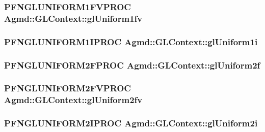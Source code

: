 \hypertarget{class_agmd_1_1_g_l_context_a8435812e978eb65ece3e0ab9ff0fcf0a}{
\subsubsection[{gl\+Uniform1fv}]{\setlength{\rightskip}{0pt plus 5cm}P\+F\+N\+G\+L\+U\+N\+I\+F\+O\+R\+M1\+F\+V\+P\+R\+O\+C Agmd\+::\+G\+L\+Context\+::gl\+Uniform1fv}}\label{class_agmd_1_1_g_l_context_a8435812e978eb65ece3e0ab9ff0fcf0a}
\hypertarget{class_agmd_1_1_g_l_context_a367e6c653c384909450dabecac8087e4}{
\subsubsection[{gl\+Uniform1i}]{\setlength{\rightskip}{0pt plus 5cm}P\+F\+N\+G\+L\+U\+N\+I\+F\+O\+R\+M1\+I\+P\+R\+O\+C Agmd\+::\+G\+L\+Context\+::gl\+Uniform1i}}\label{class_agmd_1_1_g_l_context_a367e6c653c384909450dabecac8087e4}
\hypertarget{class_agmd_1_1_g_l_context_a00ed73368112b7538f11a7064192c0c5}{
\subsubsection[{gl\+Uniform2f}]{\setlength{\rightskip}{0pt plus 5cm}P\+F\+N\+G\+L\+U\+N\+I\+F\+O\+R\+M2\+F\+P\+R\+O\+C Agmd\+::\+G\+L\+Context\+::gl\+Uniform2f}}\label{class_agmd_1_1_g_l_context_a00ed73368112b7538f11a7064192c0c5}
\hypertarget{class_agmd_1_1_g_l_context_a5dd76848abac5e82c2188642124700d3}{
\subsubsection[{gl\+Uniform2fv}]{\setlength{\rightskip}{0pt plus 5cm}P\+F\+N\+G\+L\+U\+N\+I\+F\+O\+R\+M2\+F\+V\+P\+R\+O\+C Agmd\+::\+G\+L\+Context\+::gl\+Uniform2fv}}\label{class_agmd_1_1_g_l_context_a5dd76848abac5e82c2188642124700d3}
\hypertarget{class_agmd_1_1_g_l_context_ad7f89e4e65abf41b31cf2d8baaa029db}{
\subsubsection[{gl\+Uniform2i}]{\setlength{\rightskip}{0pt plus 5cm}P\+F\+N\+G\+L\+U\+N\+I\+F\+O\+R\+M2\+I\+P\+R\+O\+C Agmd\+::\+G\+L\+Context\+::gl\+Uniform2i}}\label{class_agmd_1_1_g_l_context_ad7f89e4e65abf41b31cf2d8baaa029db}
